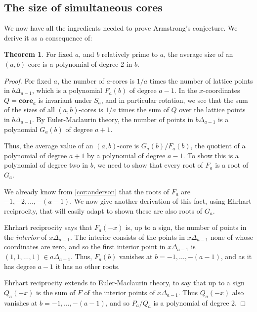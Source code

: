 \documentclass{amsart}[12pt]
\theoremstyle{definition}
\newtheorem{theorem}[dummy]{Theorem}
\newcommand{\core}{\mathbf{core}}
\begin{document}
\subsection{The size of simultaneous cores}

We now have all the ingredients needed to prove Armstrong's conjecture.  We derive it as a consequence of:

\begin{theorem} \label{thm-polynomial}
For fixed $a$, and $b$ relatively prime to $a$,  the average size of an $(a,b)$-core is a polynomial of degree 2 in $b$.
\end{theorem}

\begin{proof}
For fixed $a$, the number of $a$-cores is $1/a$ times the
number of lattice points in $b\Delta_{a-1}$, which is a polynomial
$F_a(b)$ of degree $a-1$.  In the $x$-coordinates $Q=\core_a$
is invariant under $S_a$, and in particular rotation, we see that the sum of the sizes of all $(a,b)$-cores is $1/a$ times the sum of $Q$ over the lattice points in $b\Delta_{a-1}$.   By Euler-Maclaurin theory, the number of points in $b\Delta_{a-1}$ is a polynomial $G_a(b)$ of degree $a+1$.

Thus, the average value of an $(a,b)$-core is $G_a(b)/F_a(b)$, the quotient of a polynomial of degree $a+1$ by a polynomial of degree $a-1$.  To show this is a polynomial of degree two in $b$, we need to show that every root of $F_a$ is a root of $G_a$.

We already know from \ref{cor:anderson} that the roots of $F_a$ are $-1,
-2,\dots, -(a-1)$.  We now give another derivation of this fact, using Ehrhart reciprocity, that will easily adapt to shown these are also roots of $G_a$. 

Ehrhart reciprocity says that $F_a(-x)$ is, up to a sign, the number of
points in the \emph{interior} of $x\Delta_{a-1}$.  The interior
consists of the points in $x\Delta_{a-1}$ none of whose coordinates
are zero, and so the first interior point in $x\Delta_{a-1}$ is  $(1,1,\dots,1)\in a\Delta_{a-1}$.   Thus, $F_a(b)$ vanishes at $b=-1,\dots, -(a-1)$, and as it has degree $a-1$ it has no other roots.

Ehrhart reciprocity extends to Euler-Maclaurin theory, to say that up to a sign $Q_a(-x)$ is the sum of $F$ of the interior points of
$x\Delta_{a-1}$. Thus $Q_a(-x)$ also vanishes at
$b=-1,\dots,-(a-1)$, and so $P_a/Q_a$ is a polynomial of degree 2.

\end{proof}
\end{document}
